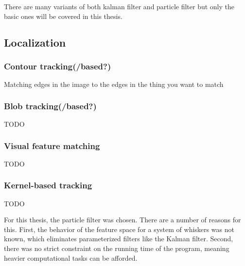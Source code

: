 There are many variants of both kalman filter and particle filter but only the basic ones will be covered in this thesis.

\subsection{Localization}
\subsubsection*{Contour tracking(/based?)}
Matching edges in the image to the edges in the thing you want to match

\subsubsection*{Blob tracking(/based?)}
TODO
\subsubsection*{Visual feature matching}
TODO
\subsubsection*{Kernel-based tracking}
TODO


For this thesis, the particle filter was chosen. There are a number of reasons for this. First, the behavior of the feature space for a system of whiskers was not known, which eliminates parameterized filters like the Kalman filter. Second, there was no strict constraint on the running time of the program, meaning heavier computational tasks can be afforded.

